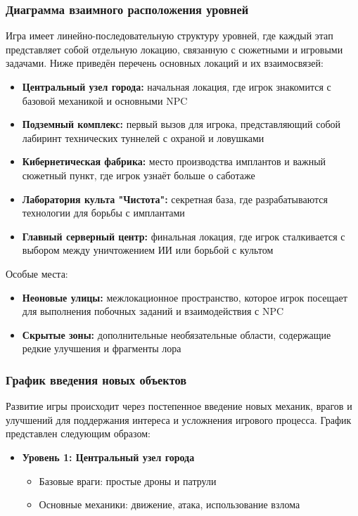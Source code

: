 \documentclass{article}
\begin{document}
\begin{itemize}
\subsubsection{Диаграмма взаимного расположения уровней}
Игра имеет линейно-последовательную структуру уровней, где каждый этап представляет собой отдельную локацию, связанную с сюжетными и игровыми задачами. Ниже приведён перечень основных локаций и их взаимосвязей:

\begin{itemize}
    \item \textbf{Центральный узел города:} начальная локация, где игрок знакомится с базовой механикой и основными NPC
    \item \textbf{Подземный комплекс:} первый вызов для игрока, представляющий собой лабиринт технических туннелей с охраной и ловушками
    \item \textbf{Кибернетическая фабрика:} место производства имплантов и важный сюжетный пункт, где игрок узнаёт больше о саботаже
    \item \textbf{Лаборатория культа "Чистота":} секретная база, где разрабатываются технологии для борьбы с имплантами
    \item \textbf{Главный серверный центр:} финальная локация, где игрок сталкивается с выбором между уничтожением ИИ или борьбой с культом
\end{itemize}

\noindent
Особые места:
\begin{itemize}
    \item \textbf{Неоновые улицы:} межлокационное пространство, которое игрок посещает для выполнения побочных заданий и взаимодействия с NPC
    \item \textbf{Скрытые зоны:} дополнительные необязательные области, содержащие редкие улучшения и фрагменты лора
\end{itemize}

\subsubsection{График введения новых объектов}

Развитие игры происходит через постепенное введение новых механик, врагов и улучшений для поддержания интереса и усложнения игрового процесса. График представлен следующим образом:

\begin{itemize}
    \item \textbf{Уровень 1: Центральный узел города}
    \begin{itemize}
        \item Базовые враги: простые дроны и патрули
        \item Основные механики: движение, атака, использование взлома
    \end{itemize}
    

\end{itemize}
\end{itemize}
\end{document}
